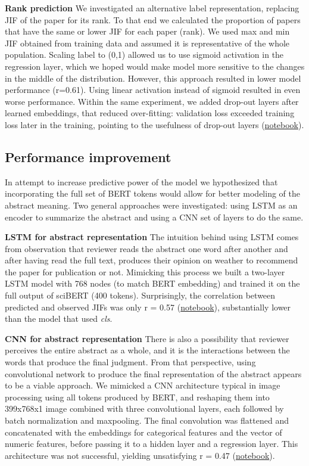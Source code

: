 \documentclass[11pt]{article}
\begin{document}
\textbf{Rank prediction} We investigated an alternative label representation, replacing JIF of the paper for its rank. To that end we calculated the proportion of papers that have the same or lower JIF for each paper (rank). We used max and min JIF obtained from training data and assumed it is representative of the whole population. Scaling label to (0,1) allowed us to use sigmoid activation in the regression layer, which we hoped would make model more sensitive to the changes in the middle of the distribution. However, this approach resulted in lower model performance (r=0.61). Using linear activation instead of sigmoid resulted in even worse performance. Within the same experiment, we added drop-out layers after learned embeddings, that reduced over-fitting: validation loss exceeded training loss later in the training, pointing to the usefulness of drop-out layers (\href{https://github.com/ArtemChemist/w266_project/blob/main/Notebooks/sciBERT_meta_rank.ipynb}{notebook}).

\subsection{Performance improvement}
In attempt to increase predictive power of the model we hypothesized that incorporating the full set of BERT tokens would allow for better modeling of the abstract meaning. Two general approaches were investigated: using LSTM as an encoder to summarize the abstract and using a CNN set of layers to do the same.

\textbf{LSTM for abstract representation} The intuition behind using LSTM comes from observation that reviewer reads the abstract one word after another and after having read the full text, produces their opinion on weather to recommend the paper for publication or not. Mimicking this process we built a two-layer LSTM model with 768 nodes (to match BERT embedding) and trained it on the full output of sciBERT (400 tokens). Surprisingly, the correlation between predicted and observed JIFs was only r = 0.57 (\href{https://github.com/ArtemChemist/w266_project/blob/main/Notebooks/sciBERT%20w%20meta%20to%20LSTM.ipynb}{notebook}), substantially lower than the model that used \textit{cls}.

\textbf{CNN for abstract representation} There is also a possibility that reviewer perceives the entire abstract as a whole, and it is the interactions between the words that produce the final judgment. From that perspective, using convolutional network to produce the final representation of the abstract appears to be a viable approach. We mimicked a CNN architecture typical in image processing using all tokens produced by BERT, and reshaping them into 399x768x1 image combined with three convolutional layers, each followed by batch normalization and maxpooling. The final convolution was flattened and concatenated with the embeddings for categorical features and the vector of numeric features, before passing it to a hidden layer and a regression layer. This architecture was not successful, yielding unsatisfying r = 0.47 (\href{https://github.com/ArtemChemist/w266_project/blob/main/Notebooks/sciBERT%20w%20small%20meta%20and%20CNN%20on%20tokens.ipynb}{notebook}).    
\end{document}
